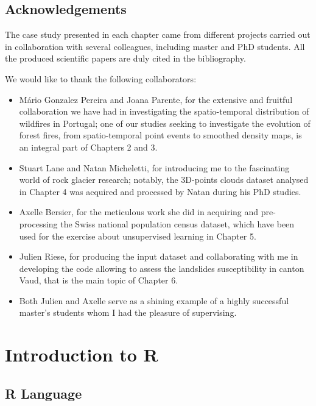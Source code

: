 \documentclass[
]{book}
\begin{document}
\hypertarget{acknowledgements}{%
\section*{Acknowledgements}\label{acknowledgements}}

The case study presented in each chapter came from different projects carried out in collaboration with several colleagues, including master and PhD students.
All the produced scientific papers are duly cited in the bibliography.

We would like to thank the following collaborators:

\begin{itemize}
\item
  Mário Gonzalez Pereira and Joana Parente, for the extensive and fruitful collaboration we have had in investigating the spatio-temporal distribution of wildfires in Portugal; one of our studies seeking to investigate the evolution of forest fires, from spatio-temporal point events to smoothed density maps, is an integral part of Chapters 2 and 3.
\item
  Stuart Lane and Natan Micheletti, for introducing me to the fascinating world of rock glacier research; notably, the 3D-points clouds dataset analysed in Chapter 4 was acquired and processed by Natan during his PhD studies.
\item
  Axelle Bersier, for the meticulous work she did in acquiring and pre-processing the Swiss national population census dataset, which have been used for the exercise about unsupervised learning in Chapter 5.
\item
  Julien Riese, for producing the input dataset and collaborating with me in developing the code allowing to assess the landslides susceptibility in canton Vaud, that is the main topic of Chapter 6.
\item
  Both Julien and Axelle serve as a shining example of a highly successful master's students whom I had the pleasure of supervising.
\end{itemize}

\hypertarget{introduction-to-r}{%
\chapter{Introduction to R}\label{introduction-to-r}}

\hypertarget{r-language}{%
\section{R Language}\label{r-language}}
\end{document}
